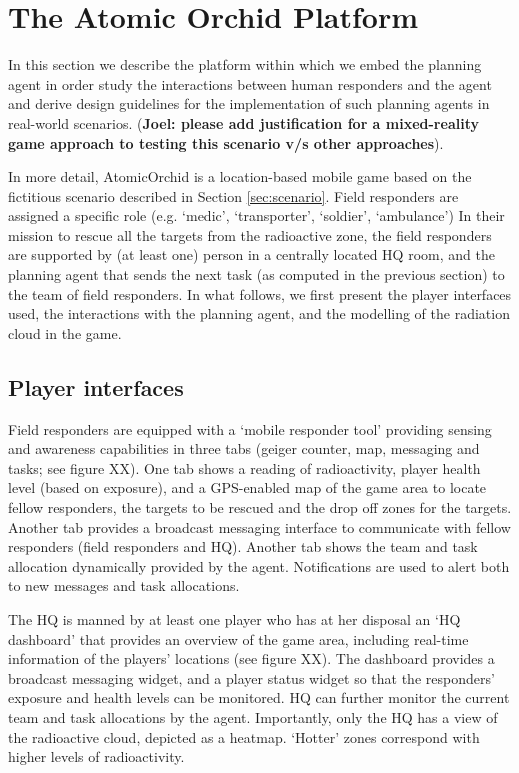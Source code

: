 \section{The Atomic Orchid Platform}
In this section we describe the platform within which we embed the planning agent in order study the interactions between human responders and the agent and derive design guidelines for the implementation of such planning agents in real-world scenarios. (\textbf{Joel: please add justification for a mixed-reality game approach to testing this scenario v/s other approaches}). 

In more detail, AtomicOrchid is a location-based mobile game based on the fictitious scenario described in Section \ref{sec:scenario}. Field responders are assigned a specific role (e.g. `medic', `transporter', `soldier', `ambulance') 
In their mission to rescue all the targets from the radioactive zone, the field responders are supported by (at least one) person in a centrally located HQ room, and the planning agent that sends the next task (as computed in the previous section) to the team of field responders. In what follows, we first present the player interfaces used, the interactions with the planning agent, and the modelling of the radiation cloud in the game.

\subsection{Player interfaces}
Field responders are equipped with a `mobile responder tool' providing sensing and awareness capabilities in three tabs (geiger counter, map, messaging and tasks; see figure XX). One tab shows a reading of radioactivity, player health level (based on exposure), and a GPS-enabled map of the game area to locate fellow responders, the targets to be rescued and the drop off zones for the targets. Another tab provides a broadcast messaging interface to communicate with fellow responders (field responders and HQ). Another tab shows the team and task allocation dynamically provided by the agent. Notifications are used to alert both to new messages and task allocations.

The HQ is manned by at least one player who has at her disposal an `HQ dashboard' that provides an overview of the game area, including real-time information of the players' locations (see figure XX). The dashboard provides a broadcast messaging widget, and a player status widget so that the responders' exposure and health levels can be monitored. HQ can further monitor the  current team and task allocations by the agent. Importantly, only the HQ has a view of the radioactive cloud, depicted as a heatmap. `Hotter' zones correspond with higher levels of radioactivity.
